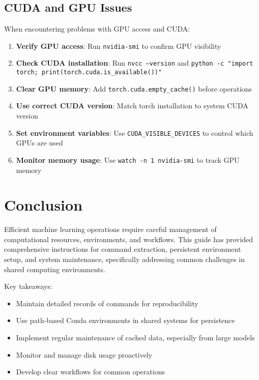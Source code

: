 \documentclass{article}
\begin{document}
\subsection{CUDA and GPU Issues}
When encountering problems with GPU access and CUDA:

\begin{tcolorbox}[colback=red!5!white, colframe=red!75!black, title=GPU Troubleshooting]
\begin{enumerate}
    \item \textbf{Verify GPU access}: Run \texttt{nvidia-smi} to confirm GPU visibility
    \item \textbf{Check CUDA installation}: Run \texttt{nvcc --version} and \texttt{python -c "import torch; print(torch.cuda.is\_available())"} 
    \item \textbf{Clear GPU memory}: Add \texttt{torch.cuda.empty\_cache()} before operations
    \item \textbf{Use correct CUDA version}: Match torch installation to system CUDA version
    \item \textbf{Set environment variables}: Use \texttt{CUDA\_VISIBLE\_DEVICES} to control which GPUs are used
    \item \textbf{Monitor memory usage}: Use \texttt{watch -n 1 nvidia-smi} to track GPU memory
\end{enumerate}
\end{tcolorbox}

\section{Conclusion}

Efficient machine learning operations require careful management of computational resources, environments, and workflows. This guide has provided comprehensive instructions for command extraction, persistent environment setup, and system maintenance, specifically addressing common challenges in shared computing environments.

Key takeaways:
\begin{itemize}
    \item Maintain detailed records of commands for reproducibility
    \item Use path-based Conda environments in shared systems for persistence
    \item Implement regular maintenance of cached data, especially from large models
    \item Monitor and manage disk usage proactively
    \item Develop clear workflows for common operations
\end{itemize}
\end{document}
